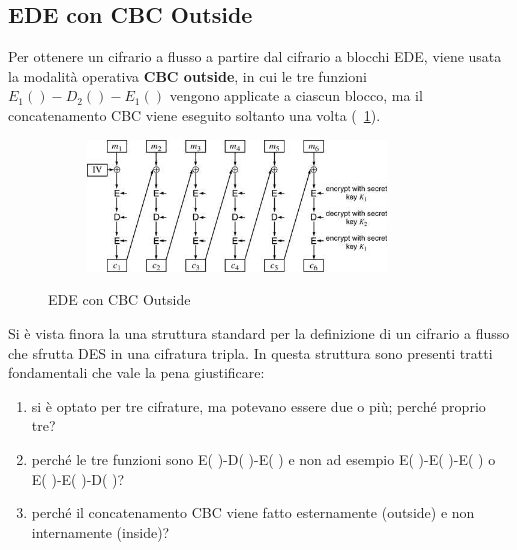 \subsection{EDE con CBC Outside}
Per ottenere un cifrario a flusso a partire dal cifrario a blocchi EDE, viene usata la modalità operativa \textbf{CBC outside}, in cui le tre funzioni $E_{1}()-D_{2}()-E_{1}()$ vengono applicate a ciascun blocco, ma il concatenamento CBC viene eseguito soltanto una volta (\figurename~\ref{fig:EDE_CBC_Out}).\\ 
\begin{figure}[htbp]
	\centering%
	\subfigure%
	{\includegraphics[height=3.5cm, width=10cm, keepaspectratio]{Immagini/modalita_operative/EDE_CBC_Out.png}}
	\caption{EDE con CBC Outside \label{fig:EDE_CBC_Out}} 	
\end{figure}
Si è vista finora la una struttura standard per la definizione di un cifrario a flusso che sfrutta DES in una cifratura tripla. In questa struttura sono presenti tratti fondamentali che vale la pena giustificare:
\begin{enumerate}
\item si è optato per tre cifrature, ma potevano essere due o più; perché proprio tre?
\item perché le tre funzioni sono E( )-D( )-E( ) e non ad esempio E( )-E( )-E( ) o E( )-E( )-D( )? 
\item perché il concatenamento CBC viene fatto esternamente (outside) e non internamente (inside)?
\end{enumerate}


